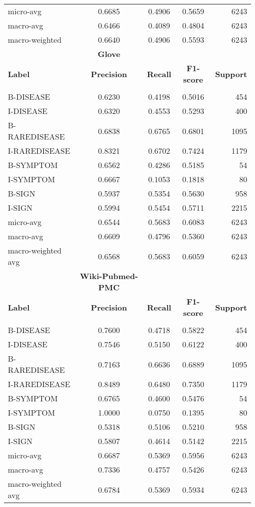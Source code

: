 \documentclass[preprint,12pt]{elsarticle}
\begin{document}
\begin{table}[H]
\begin{tabular}{lcccr}
micro-avg	&	0.6685	&	0.4906	&	0.5659	&	6243\\
macro-avg	&	0.6466	&	0.4089	&	0.4804	&	6243\\
macro-weighted	&	0.6640	&	0.4906	&	0.5593	&	6243\\
\hline

& \multicolumn{1}{c}{\textbf{Glove}} \\
{\bf Label} & {\bf Precision} &
{\bf Recall} &
{\bf F1-score} & {\bf Support} \\
\hline\\[-8pt]
B-DISEASE	&	0.6230	&	0.4198	&	0.5016	&	454\\
I-DISEASE	&	0.6320	&	0.4553	&	0.5293	&	400\\
B-RAREDISEASE	&	0.6838	&	0.6765	&	0.6801	&	1095\\
I-RAREDISEASE	&	0.8321	&	0.6702	&	0.7424	&	1179\\
B-SYMPTOM	&	0.6562	&	0.4286	&	0.5185	&	54\\
I-SYMPTOM	&	0.6667	&	0.1053	&	0.1818	&	80\\
B-SIGN	&	0.5937	&	0.5354	&	0.5630	&	958\\I-SIGN	&	0.5994	&	0.5454	&	0.5711	&	2215\\

micro-avg	&	0.6544	&	0.5683	&	0.6083	&	6243\\
macro-avg	&	0.6609	&	0.4796	&	0.5360	&	6243\\
macro-weighted avg	&	0.6568	&	0.5683	&	0.6059	&	6243\\

\hline
& \multicolumn{1}{c}{\textbf{Wiki-Pubmed-PMC}} \\
{\bf Label} & {\bf Precision} &
{\bf Recall} &
{\bf F1-score} & {\bf Support} \\
\hline\\[-8pt]
B-DISEASE	&	0.7600	&	0.4718	&	0.5822	&	454\\
I-DISEASE	&	0.7546	&	0.5150	&	0.6122	&	400\\
B-RAREDISEASE	&	0.7163	&	0.6636	&	0.6889	&	1095\\
I-RAREDISEASE	&	0.8489	&	0.6480	&	0.7350	&	1179\\B-SYMPTOM	&	0.6765	&	0.4600	&	0.5476	&	54\\I-SYMPTOM	&	1.0000	&	0.0750	&	0.1395	&	80\\
B-SIGN	&	0.5318	&	0.5106	&	0.5210	&	958\\
I-SIGN	&	0.5807	&	0.4614	&	0.5142	&	2215\\micro-avg	&	0.6687	&	0.5369	&	0.5956	&	6243\\macro-avg	&	0.7336	&	0.4757	&	0.5426	&	6243\\
macro-weighted avg	&	0.6784	&	0.5369	&	0.5934	&	6243\\
\hline
\end{tabular}
\end{table}
\end{document}
